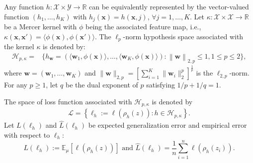 \documentclass{article}
\begin{document}
Any function $h:\mathcal{X}\times\mathcal{Y}\rightarrow \mathbb{R}$ can be equivalently represented by the vector-valued function
$(h_1,\ldots,h_K)$ with $h_j(\mathbf x)=h(\mathbf x,j)$, $\forall j=1,\ldots,K$.
Let $\kappa:\mathcal{X}\times\mathcal{X}\rightarrow\mathbb{R}$ be a Mercer kernel with $\phi$ being the associated feature map,
i.e., $\kappa(\mathbf x,\mathbf x')=\langle \phi(\mathbf x),\phi(\mathbf x')\rangle$.
The $\ell_p$-norm hypothesis space associated with the kernel $\kappa$ is denoted by:
 \begin{align}
 \label{hypothspapce}
   \mathcal{H}_{p,\kappa}=&\Big\{h_\mathbf{w}=\left(\langle \mathbf w_1,\phi(\mathbf x)\rangle,\ldots, \langle\mathbf w_K,\phi(\mathbf x)\rangle\right):
   \left\|\mathbf  w \right\|_{2,p}\leq 1, 1\leq p\leq 2
  \Big\},
 \end{align}
 where $\mathbf w=(\mathbf w_1,\ldots,\mathbf w_K)$ and $\|\mathbf w\|_{2,p}=\left[\sum_{i=1}^K\|\mathbf w_i\|_2^p\right]^{\frac{1}{p}}$
 is the $\ell_{2,p}$-norm.
 For any $p\geq 1$, let $q$ be the dual exponent of $p$ satisfying ${1}/{p}+{1}/{q}=1$.

The space of loss function associated with $\mathcal{H}_{p,\kappa}$  is denoted by
\begin{align}
\label{eq-sapce-loss-functions}
  \mathcal{L}=\left\{\ell_h:=\ell(\rho_h(z)):h\in\mathcal{H}_{p,\kappa}\right\}.
\end{align}
Let $L(\ell_h)$ and  $\hat{L}(\ell_h)$ be expected generalization error and
 empirical error  with respect to $\ell_h$:
$$
  L(\ell_h):=\mathbb{E}_\mu[\ell(\rho_h(z))] \text{ and } \hat{L}(\ell_h)=\frac{1}{n}\sum_{i=1}^n\ell(\rho_h(z_i)).
$$




\end{document}
